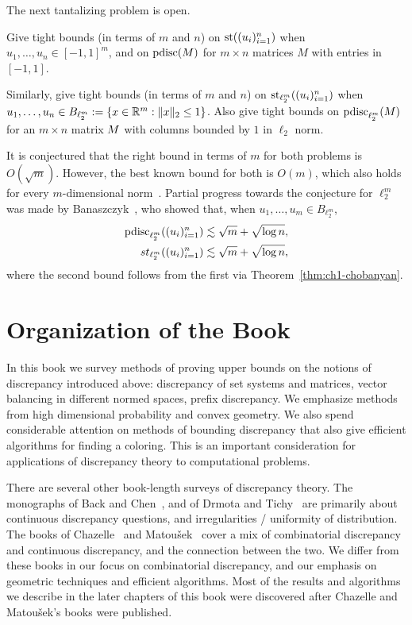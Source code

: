 The next tantalizing problem is open.
\begin{problem}\label{prob:steinitz}
  Give tight bounds (in terms of $m$ and $n$) on $\operatorname{st}((u_i)_{i=1}^n)$ when $u_1, \ldots, u_n \in [-1,1]^m$, and on $\operatorname{pdisc}(M)$ for $m\times n$ matrices $M$ with entries in $[-1,1]$. 

  Similarly, give tight bounds (in terms of $m$ and $n$) on $\operatorname{st}_{\ell_2^m}((u_i)_{i=1}^n)$ when $u_1, \ldots, u_n \in B_{\ell_2^m} := \{x \in \mathbb{R}^m: \|x\|_2 \le 1\}$. Also give tight bounds on $\operatorname{pdisc}_{\ell_2^m}(M)$ for an $m\times n$ matrix $M$ with columns bounded by $1$ in $\ell_2$ norm.
\end{problem}

It is conjectured that the right bound in terms of $m$ for both problems is $O(\sqrt{m})$. However, the best known bound for both is $O(m)$,
which also holds for every $m$-dimensional
norm~\cite{Sev78,GS80,baranygrinberg}. Partial progress towards the
conjecture for $\ell_2^m$ was made by Banaszczyk~\cite{B12}, who
showed that, when $u_1, \ldots, u_m \in B_{\ell_2^m}$, 
\begin{align*}
\operatorname{pdisc}_{\ell_2^m}((u_i)_{i=1}^n) &\lesssim \sqrt{m} + \sqrt{\log n},\\
st_{\ell_2^m}((u_i)_{i=1}^n) &\lesssim \sqrt{m} +
\sqrt{\log n},
\end{align*}
where the second bound follows from the first via Theorem~\ref{thm:ch1-chobanyan}.

\section{Organization of the Book}

In this book we survey methods of proving upper bounds on the notions
of discrepancy introduced above: discrepancy of set systems and matrices, vector balancing in different normed spaces, prefix discrepancy. We emphasize
methods from high dimensional probability and convex geometry. We also
spend considerable attention on methods of bounding discrepancy that
also give efficient algorithms for finding a coloring. This
is an important consideration for applications of discrepancy theory
to computational problems.

There are several other book-length surveys of discrepancy theory. The monographs of Back and Chen~\cite{BeckChen-book}, and of Drmota and Tichy~\cite{DrmotaTichy97} are primarily about continuous discrepancy questions, and irregularities / uniformity of distribution. The books of Chazelle~\cite{chazelle2001discrepancy} and Matou\v{s}ek~\cite{matousek2010geometric} cover a mix of combinatorial discrepancy and continuous discrepancy, and the connection between the two. We differ from these books in our focus on combinatorial discrepancy, and our emphasis on geometric techniques and efficient algorithms. Most of the results and algorithms we describe in the later chapters of this book were discovered after Chazelle and Matou\v{s}ek's books were published. 

